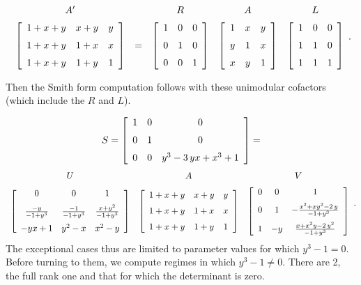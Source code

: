 \documentclass[10pt]{article}
\begin{document}
\[
\begin{array}{ccccc}
A' & ~ & R & A & L\\\noalign{\medskip}
\left [\begin {array}{ccc} 
1+x+y&x+y&y\\\noalign{\medskip}
1+x+y&1+x&x\\\noalign{\medskip}
1+x+y&1+y&1\end {array}\right ]
& = & 
\left [\begin {array}{ccc} 
1&0&0\\\noalign{\medskip}
0&1&0\\\noalign{\medskip}
0&0&1\end {array}\right ]
&
\left [\begin {array}{ccc} 
1&x&y\\\noalign{\medskip}
y&1&x\\\noalign{\medskip}
x&y&1\end {array}\right ]
&
\left [\begin {array}{ccc} 
1&0&0\\\noalign{\medskip}
1&1&0\\\noalign{\medskip}
1&1&1\end {array}\right ]
\end{array}.
\]
 
Then the Smith form computation follows with these unimodular cofactors 
(which include the $R$ and $L$).

\[
S = 
\left [\begin {array}{ccc} 
1&0&0\\\noalign{\medskip}
0&1&0\\\noalign{\medskip}
0&0&{y}^{3}-3\,yx+{x}^{3}+1\end {array}\right ] =
\]\[
\begin{array}{cccc}
U & A & V\\\noalign{\medskip}
\left [\begin {array}{ccc} 
0&0&1\\\noalign{\medskip}
{\frac {-y}{-1+{y}^{3}}}&{\frac {-1}{-1+{y}^{3}}}&{\frac {x+{y}^{2}}{-1+{y}^{3}}}\\\noalign{\medskip}
-yx+1&{y}^{2}-x&{x}^{2}-y\end {array}\right ]
&
\left [\begin {array}{ccc} 
1+x+y&x+y&y\\\noalign{\medskip}
1+x+y&1+x&x\\\noalign{\medskip}
1+x+y&1+y&1\end {array}\right ]
&
\left [\begin {array}{ccc} 0&0&1\\\noalign{\medskip}0&1&-{\frac {{x}^{2
}+x{y}^{2}-2\,y}{-1+{y}^{3}}}\\\noalign{\medskip}1&-y&{\frac {x+{x}^{2}
y-2\,{y}^{2}}{-1+{y}^{3}}}\end {array}\right ]
\end{array}.
\]
\newpage
The exceptional cases thus are limited to parameter values for which ${y}^{3} - 1 = 0$.
Before turning to them, we compute regimes in which ${y}^{3} - 1 \neq 0$.
There are 2, the full rank one and that for which the determinant is zero.
\end{document}
